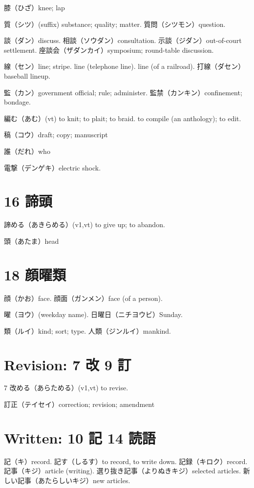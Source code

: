 膝（ひざ）knee; lap

質（シツ）(suffix) substance; quality; matter.
質問（シツモン）question.

談（ダン）discuss.
相談（ソウダン）consultation.
示談（ジダン）out-of-court settlement.
座談会（ザダンカイ）symposium; round-table discussion.

線（セン）line; stripe.
line (telephone line).
line (of a railroad).
打線（ダセン）baseball lineup.

監（カン）government official; rule; administer.
監禁（カンキン）confinement; bondage.

編む（あむ）(vt)
to knit; to plait; to braid.
to compile (an anthology); to edit.

稿（コウ）draft; copy; manuscript

誰（だれ）who

電撃（デンゲキ）electric shock.

\section{16 諦頭}

諦める（あきらめる）(v1,vt)
to give up; to abandon.

頭（あたま）head

\section{18 顔曜類}

顔（かお）face.
顔面（ガンメン）face (of a person).

曜（ヨウ）(weekday name).
日曜日（ニチヨウビ）Sunday.

類（ルイ）kind; sort; type.
人類（ジンルイ）mankind.

\section{Revision: 7 改 9 訂}

7 改める（あらためる）(v1,vt) to revise.

訂正（テイセイ）correction; revision; amendment

\section{Written: 10 記 14 読語}

記（キ）record.
記す（しるす）to record, to write down.
記録（キロク）record.
記事（キジ）article (writing).
選り抜き記事（よりぬきキジ）selected articles.
新しい記事（あたらしいキジ）new articles.

